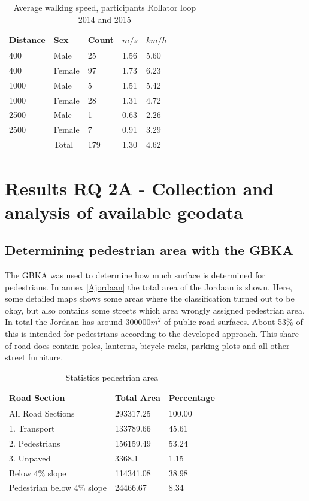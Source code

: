 \begin{table}[ht]
\caption{Average walking speed, participants Rollator loop 2014 and 2015 \label{statistiswalkingspeed}}
\centering
\begin{tabular}{|l|l|l|l|l|l|l|l|l|}
\hline
Distance & Sex & Count & $m/s$ & $km/h$ \\
\hline
400 & Male	 & 25	& 1.56 & 5.60 \\
400 & Female & 97	& 1.73 & 6.23 \\
\hline
1000 & Male		& 5	 & 1.51	 & 5.42\\
1000 & Female	& 28 & 	1.31 & 4.72\\
\hline
2500 & Male		& 1	 & 0.63	 & 2.26\\
2500 & Female	& 7	 & 0.91	 & 3.29\\
\hline
& Total & 179 & 1.30 & 4.62 \\
\hline
\end{tabular}
\end{table}
\clearpage


\section{Results RQ 2A -  Collection and analysis of available geodata}
\subsection{Determining pedestrian area with the GBKA}
The GBKA was used to determine how much surface is determined for pedestrians. In annex \ref{Ajordaan} the total area of the Jordaan is shown. Here, some detailed maps shows some areas where the classification turned out to be okay, but also contains some streets which area wrongly assigned pedestrian area. In total the Jordaan has around 300000$m^2$ of public road surfaces. About 53\% of this is intended for pedestrians according to the developed approach. This share of road does contain poles, lanterns, bicycle racks, parking plots and all other street furniture. 

\begin{table}[h]
\caption{Statistics pedestrian area \label{statroadsections}}
\centering
\begin{tabular}{|l|l|l|}
\hline
Road Section & Total Area	& Percentage\\
\hline
All Road Sections & 293317.25 & 100.00\\
\hline
1. Transport & 133789.66 & 45.61\\
2. Pedestrians & 156159.49 & 53.24\\
3. Unpaved	& 3368.1 & 1.15\\
\hline
Below 4\% slope & 114341.08 & 38.98\\
Pedestrian below 4\% slope & 24466.67 & 8.34\\
\hline
\end{tabular}
\end{table}

